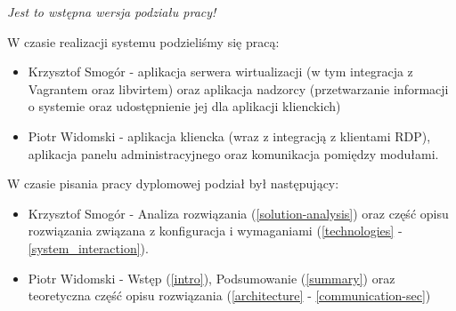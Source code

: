 \documentclass[../wstep.tex]{subfiles}
\begin{document}
\textit{Jest to wstępna wersja podziału pracy!}

W czasie realizacji systemu podzieliśmy się pracą:
\begin{itemize}
	\item Krzysztof Smogór - aplikacja serwera wirtualizacji (w tym integracja z Vagrantem oraz libvirtem) oraz aplikacja nadzorcy (przetwarzanie informacji o systemie oraz udostępnienie jej dla aplikacji klienckich)
	\item Piotr Widomski - aplikacja kliencka (wraz z integracją z klientami RDP), aplikacja panelu administracyjnego oraz komunikacja pomiędzy modułami.
\end{itemize}

W czasie pisania pracy dyplomowej podział był następujący:
\begin{itemize}
	\item Krzysztof Smogór - Analiza rozwiązania (\ref{solution-analysis}) oraz część opisu rozwiązania związana z konfiguracja i wymaganiami (\ref{technologies} - \ref{system_interaction}).
	\item Piotr Widomski - Wstęp (\ref{intro}), Podsumowanie (\ref{summary}) oraz teoretyczna część opisu rozwiązania (\ref{architecture} - \ref{communication-sec})
\end{itemize}
\end{document}
